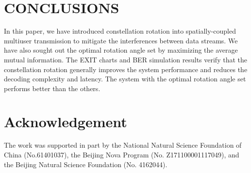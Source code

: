 \documentclass[conference]{IEEEtran}
\begin{document}
\section{CONCLUSIONS}
In this paper, we have introduced constellation rotation into spatially-coupled multiuser transmission to mitigate the interferences between data streams. We have also sought out the optimal rotation angle set by maximizing the average mutual information. The EXIT charts and BER simulation results verify that the constellation rotation generally improves the system performance and reduces the decoding complexity and latency. The system with the optimal rotation angle set performs better than the others.
\section*{Acknowledgement}
The work was supported in part by the National Natural Science Foundation of China (No.61401037), the Beijing Nova Program (No. Z171100001117049), and the Beijing Natural Science Foundation (No. 4162044).








\end{document}
